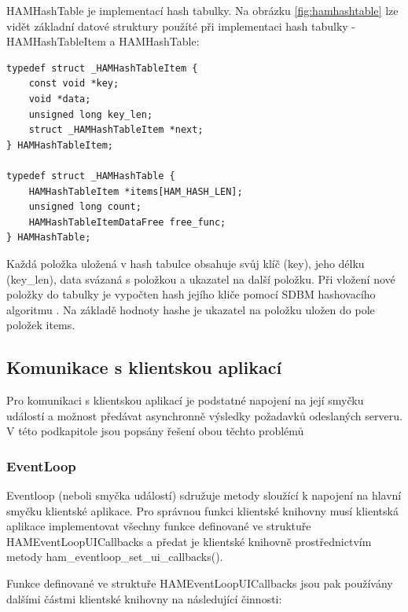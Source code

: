 HAMHashTable je implementací hash tabulky. Na obrázku \ref{fig:hamhashtable} lze vidět základní datové struktury
použíté při implementaci hash tabulky - HAMHashTableItem a HAMHashTable:

\begin{verbatim}
typedef struct _HAMHashTableItem {
	const void *key;
	void *data;
	unsigned long key_len;
	struct _HAMHashTableItem *next;
} HAMHashTableItem;

typedef struct _HAMHashTable {
	HAMHashTableItem *items[HAM_HASH_LEN];
	unsigned long count;
	HAMHashTableItemDataFree free_func;
} HAMHashTable;
\end{verbatim}

Každá položka uložená v hash tabulce obsahuje svůj klíč (key), jeho délku (key\_len), data svázaná s položkou a ukazatel
na další položku. Při vložení nové položky do tabulky je vypočten hash jejího kliče pomocí SDBM
hashovacího algoritmu \cite{sdbm}. %
Na základě hodnoty hashe je ukazatel na položku uložen do pole položek items.

\subsection{Komunikace s klientskou aplikací}
\label{implementace_knihovna_komunikace}

Pro komunikaci s klientskou aplikací je podstatné napojení na její smyčku událostí a možnost předávat asynchronně
výsledky požadavků odeslaných serveru. V této podkapitole jsou popsány řešení obou těchto problémů

\subsubsection{EventLoop}

Eventloop (neboli smyčka událostí) sdružuje metody sloužící k napojení na hlavní smyčku
klientské aplikace. Pro správnou funkci klientské
knihovny musí klientská aplikace implementovat všechny funkce definované ve struktuře HAMEventLoopUICallbacks a
předat je klientské knihovně prostřednictvím metody ham\_eventloop\_set\_ui\_callbacks().

Funkce definované ve struktuře HAMEventLoopUICallbacks jsou pak používány dalšími částmi klientské knihovny na
následující činnosti:

